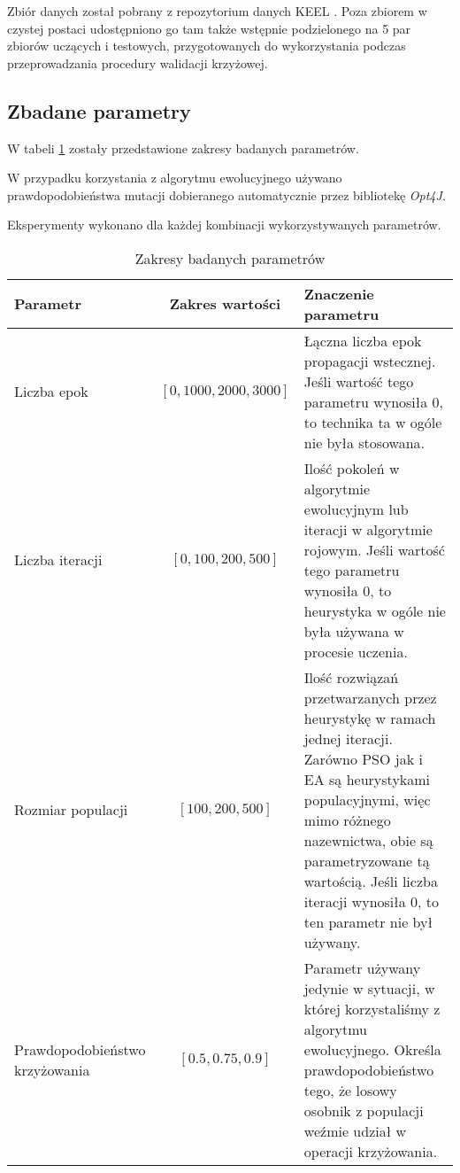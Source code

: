 \documentclass[11pt,a4paper,oneside]{report}
\begin{document}
Zbiór danych został pobrany z repozytorium danych KEEL \cite{alcala2010keel}. Poza zbiorem w czystej postaci udostępniono go tam także wstępnie podzielonego na 5 par zbiorów uczących i testowych, przygotowanych do wykorzystania podczas przeprowadzania procedury walidacji krzyżowej.

\subsection{Zbadane parametry}

W tabeli \ref{table:params} zostały przedstawione zakresy badanych parametrów.

W przypadku korzystania z algorytmu ewolucyjnego używano prawdopodobieństwa mutacji dobieranego automatycznie przez bibliotekę \emph{Opt4J}.

Eksperymenty wykonano dla każdej kombinacji wykorzystywanych parametrów.

\begin{table}[H]
	\caption{Zakresy badanych parametrów \label{table:params}}
	\begin{tabularx}{\linewidth}{|X|c|X|}
		\hline
		\textbf{Parametr} & \textbf{Zakres wartości} & Znaczenie parametru\\
		\hline \hline
		Liczba epok & $[0, 1000, 2000, 3000]$ & Łączna liczba epok propagacji wstecznej\footnotemark[1]. Jeśli wartość tego parametru wynosiła 0, to technika ta w ogóle nie była stosowana. \\
		\hline
		Liczba iteracji & $[0, 100, 200, 500]$ & Ilość pokoleń w algorytmie ewolucyjnym lub iteracji w algorytmie rojowym. Jeśli wartość tego parametru wynosiła 0, to heurystyka w ogóle nie była używana w procesie uczenia. \\
		\hline
		Rozmiar populacji & $[100, 200, 500]$ &  Ilość rozwiązań przetwarzanych przez heurystykę w ramach jednej iteracji. Zarówno PSO jak i EA są heurystykami populacyjnymi, więc mimo różnego nazewnictwa, obie są parametryzowane tą wartością. Jeśli liczba iteracji wynosiła 0, to ten parametr nie był używany. \\
		\hline
		Prawdopodobieństwo krzyżowania & $[0.5, 0.75, 0.9]$	& Parametr używany jedynie w sytuacji, w której korzystaliśmy z algorytmu ewolucyjnego. Określa prawdopodobieństwo tego, że losowy osobnik z populacji weźmie udział w operacji krzyżowania. \\
		\hline
	\end{tabularx}
\end{table}
\end{document}
